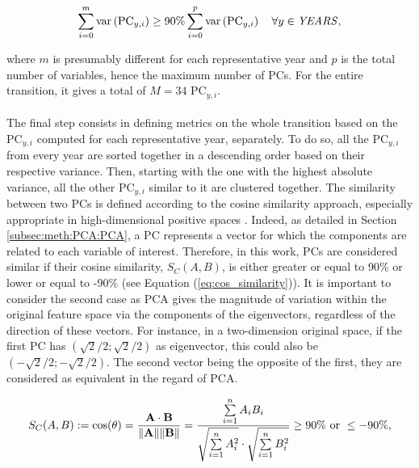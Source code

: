 \begin{equation}
\label{eq:PC_year}
\sum_{i=0}^m\text{var}\left(\text{PC}_{y,i}\right)\geq 90\% \sum_{i=0}^p\text{var}\left(\text{PC}_{y,i}\right) \quad \forall y \in \text{\emph{YEARS}},
\end{equation}

\noindent
where $m$ is presumably different for each representative year and $p$ is the total number of variables, hence the maximum number of PCs. For the entire transition, it gives a total of $M=34$ $\text{PC}_{y,i}$.\\

\\

\noindent
The final step consists in defining metrics on the whole transition based on the $\text{PC}_{y,i}$ computed for each representative year, separately. To do so, all the $\text{PC}_{y,i}$ from every year are sorted together in a descending order based on their respective variance. Then, starting with the one with the highest absolute variance, all the other $\text{PC}_{y,i}$ similar to it are clustered together. The similarity between two PCs is defined according to the cosine similarity approach, especially appropriate in high-dimensional positive spaces \cite{xia2015learning}. Indeed, as detailed in Section \ref{subsec:meth:PCA:PCA}, a PC represents a vector for which the components are related to each variable of interest. Therefore, in this work, PCs are considered similar if their cosine similarity, $S_C (A,B)$, is either greater or equal to 90\% or lower or equal to -90\% (see Equation (\ref{eq:cos_similarity})). It is important to consider the second case as \gls{PCA} gives the magnitude of variation within the original feature space via the components of the eigenvectors, regardless of the direction of these vectors. For instance, in a two-dimension original space, if the first PC has $(\sqrt{2}/2;\sqrt{2}/2)$ as eigenvector, this could also be $(-\sqrt{2}/2;-\sqrt{2}/2)$. The second vector being the opposite of the first, they are considered as equivalent in the regard of \gls{PCA}.

\begin{equation}
\label{eq:cos_similarity}
S_C (A,B):= \cos(\theta) = {\mathbf{A} \cdot \mathbf{B} \over \|\mathbf{A}\| \|\mathbf{B}\|} = \frac{ \sum\limits_{i=1}^{n}{A_i  B_i} }{ \sqrt{\sum\limits_{i=1}^{n}{A_i^2}} \cdot \sqrt{\sum\limits_{i=1}^{n}{B_i^2}} } \geq 90\%\text{ or } \leq -90\%,
\end{equation}


